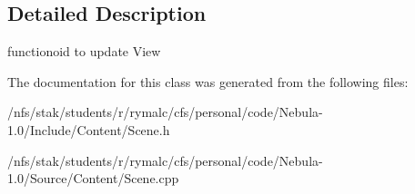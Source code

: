 \subsection{Detailed Description}
functionoid to update View 

The documentation for this class was generated from the following files:\begin{DoxyCompactItemize}
\item 
/nfs/stak/students/r/rymalc/cfs/personal/code/Nebula-\/1.0/Include/Content/Scene.h\item 
/nfs/stak/students/r/rymalc/cfs/personal/code/Nebula-\/1.0/Source/Content/Scene.cpp\end{DoxyCompactItemize}
